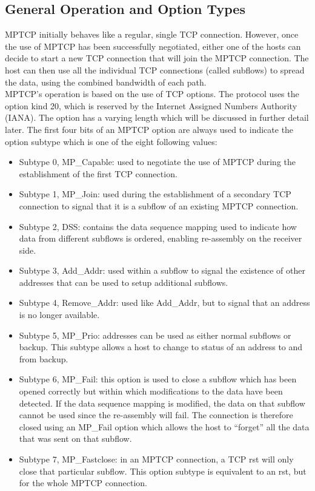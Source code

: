 \documentclass[12pt, a4paper, oneside]{article} %
\begin{document}
\subsection{General Operation and Option Types}
MPTCP initially behaves like a regular, single TCP connection. However, once the use of MPTCP has been successfully negotiated, either one of the hosts can decide to start a new TCP connection that will join the MPTCP connection. The host can then use all the individual TCP connections (called subflows) to spread the data, using the combined bandwidth of each path.\\

MPTCP's operation is based on the use of TCP options. The protocol uses the option kind 20, which is reserved by the Internet Assigned Numbers Authority (IANA). The option has a varying length which will be discussed in further detail later. The first four bits of an MPTCP option are always used to indicate the option subtype which is one of the eight following values:

\begin{itemize}
\item Subtype 0, MP\_Capable: used to negotiate the use of MPTCP during the establishment of the first TCP connection.
\item Subtype 1, MP\_Join: used during the establishment of a secondary TCP connection to signal that it is a subflow of an existing MPTCP connection.
\item Subtype 2, DSS: contains the data sequence mapping used to indicate how data from different subflows is ordered, enabling re-assembly on the receiver side.
\item Subtype 3, Add\_Addr: used within a subflow to signal the existence of other addresses that can be used to setup additional subflows.
\item Subtype 4, Remove\_Addr: used like Add\_Addr, but to signal that an address is no longer available.
\item Subtype 5, MP\_Prio: addresses can be used as either normal subflows or backup. This subtype allows a host to change to status of an address to and from backup.
\item Subtype 6, MP\_Fail: this option is used to close a subflow which has been opened correctly but within which modifications to the data have been detected. If the data sequence mapping is modified, the data on that subflow cannot be used since the re-assembly will fail. The connection is therefore closed using an MP\_Fail option which allows the host to ``forget'' all the data that was sent on that subflow.
\item Subtype 7, MP\_Fastclose: in an MPTCP connection, a TCP rst will only close that particular subflow. This option subtype is equivalent to an rst, but for the whole MPTCP connection.
\end{itemize}
\end{document}
